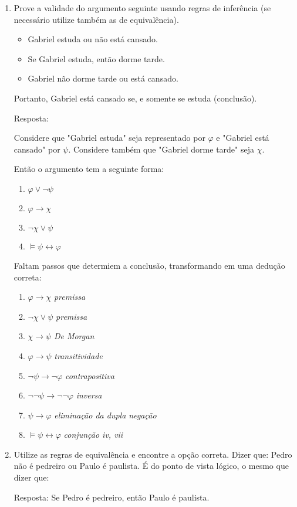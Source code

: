 \documentclass[11pt]{article}
\begin{document}
\begin{enumerate}
\item 
	Prove a validade do argumento seguinte usando regras de inferência (se necessário utilize também as de equivalência).
	\begin{itemize}
		\item Gabriel estuda ou não está cansado.
		\item Se Gabriel estuda, então dorme tarde.
		\item Gabriel não dorme tarde ou está cansado. 
	\end{itemize}
	Portanto, Gabriel está cansado se, e somente se estuda (conclusão).

	Resposta:

	Considere que "Gabriel estuda" seja representado por $\varphi$ e "Gabriel está cansado" por $\psi$. Considere também que "Gabriel dorme tarde" seja $\chi$.   

	Então o argumento tem a seguinte forma:
	\begin{enumerate}[label=\roman*]
  		\item $\varphi \vee \neg \psi$ 
  		\item $\varphi \rightarrow \chi$
  		\item $\neg \chi \vee \psi$ 
		\item $\models \psi \leftrightarrow \varphi$ 
	\end{enumerate}

	Faltam passos que determiem a conclusão, transformando em uma dedução correta:

	\begin{enumerate}[label=\roman*]
  		\item $\varphi \rightarrow \chi$ \textit{premissa}
  		\item $\neg \chi \vee \psi$ \textit{premissa}
  		\item $\chi \rightarrow \psi $ \textit{De Morgan}
  		\item $\varphi \rightarrow  \psi$ \textit{transitividade}
  		\item $\neg \psi \rightarrow  \neg \varphi$ \textit{contrapositiva}
  		\item $\neg\neg \psi \rightarrow  \neg\neg \varphi$ \textit{inversa}
  		\item $\psi \rightarrow  \varphi$ \textit{eliminação da dupla negação}
		\item $\models \psi \leftrightarrow \varphi$  \textit{conjunção iv, vii} 
	\end{enumerate}

\item Utilize as regras de equivalência e encontre a opção correta. \smallskip 
	Dizer que: Pedro não é pedreiro ou Paulo é paulista. É do ponto de vista lógico, o mesmo que dizer que:\smallskip

	Resposta:
	Se Pedro é pedreiro, então Paulo é paulista.

\end{enumerate}
\end{document}
